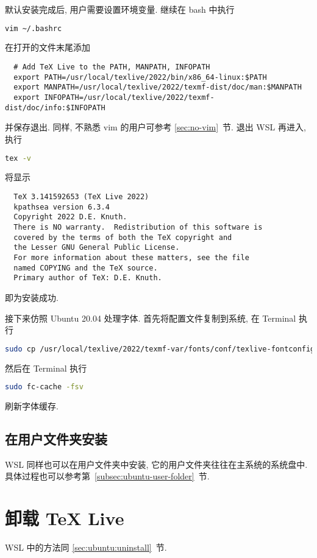 默认安装完成后, 用户需要设置环境变量.
继续在 \textsf{bash} 中执行
\begin{lstlisting}[language = bash]
  vim ~/.bashrc
\end{lstlisting}
在打开的文件末尾添加
\begin{lstlisting}
  # Add TeX Live to the PATH, MANPATH, INFOPATH
  export PATH=/usr/local/texlive/2022/bin/x86_64-linux:$PATH
  export MANPATH=/usr/local/texlive/2022/texmf-dist/doc/man:$MANPATH
  export INFOPATH=/usr/local/texlive/2022/texmf-dist/doc/info:$INFOPATH
\end{lstlisting}
并保存退出.
同样, 不熟悉 \textsf{vim} 的用户可参考 \ref{sec:no-vim}~节.
退出 WSL 再进入, 执行
\begin{lstlisting}[language=bash]
  tex -v
\end{lstlisting}
将显示
\begin{lstlisting}
  TeX 3.141592653 (TeX Live 2022)
  kpathsea version 6.3.4
  Copyright 2022 D.E. Knuth.
  There is NO warranty.  Redistribution of this software is
  covered by the terms of both the TeX copyright and
  the Lesser GNU General Public License.
  For more information about these matters, see the file
  named COPYING and the TeX source.
  Primary author of TeX: D.E. Knuth.
\end{lstlisting}
即为安装成功.

接下来仿照 Ubuntu 20.04 处理字体.
首先将配置文件复制到系统,
在 \textsf{Terminal} 执行
\begin{lstlisting}[language=bash]
  sudo cp /usr/local/texlive/2022/texmf-var/fonts/conf/texlive-fontconfig.conf /etc/fonts/conf.d/09-texlive.conf
\end{lstlisting}
然后在 \textsf{Terminal} 执行
\begin{lstlisting}[language=bash]
  sudo fc-cache -fsv
\end{lstlisting}
刷新字体缓存.

\subsection{在用户文件夹安装}

WSL 同样也可以在用户文件夹中安装,
它的用户文件夹往往在主系统的系统盘中.
具体过程也可以参考第~\ref{subsec:ubuntu-user-folder}~节.

\section{卸载 \TeX{} Live}

WSL 中的方法同 \ref{sec:ubuntu:uninstall}~节.

